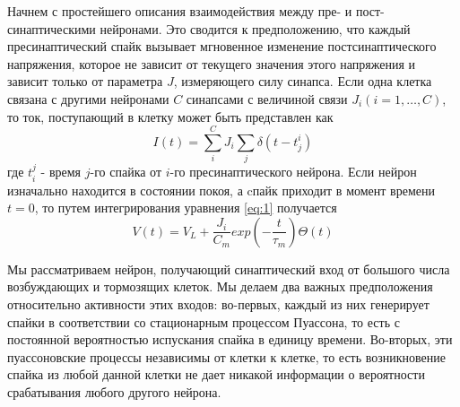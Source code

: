 Начнем с простейшего описания взаимодействия между пре- и пост-синаптическими нейронами. Это сводится к предположению, что каждый пресинаптический спайк вызывает мгновенное изменение постсинаптического напряжения, которое не зависит от текущего значения этого напряжения и зависит только от параметра $J$, измеряющего силу синапса. Если одна клетка связана с другими нейронами $C$ синапсами с величиной связи $J_i (i=1,\ldots,C)$, то ток, поступающий в клетку может быть представлен как
\begin{equation}
	I(t)=\sum_{i}^{C}J_i\sum_{j}\delta(t-t_j^i)
	\label{eq:3}
\end{equation}
где $t_i^j$ - время $j$-го спайка от $i$-го пресинаптического нейрона. Если нейрон изначально находится в состоянии покоя, а cпайк приходит в момент времени $t=0$, то путем интегрирования уравнения \eqref{eq:1} получается
\begin{equation}
	V(t)=V_L+\frac{J_i}{C_m}exp(-\frac{t}{\tau_m})\Theta(t)
	\label{eq:4}
\end{equation}

Мы рассматриваем нейрон, получающий синаптический вход от большого числа возбуждающих и тормозящих клеток. Мы делаем два важных предположения относительно активности этих входов: во-первых, каждый из них генерирует спайки в соответствии со стационарным процессом Пуассона, то есть с постоянной вероятностью испускания спайка в единицу времени. Во-вторых,
эти пуассоновские процессы независимы от клетки к клетке, то есть возникновение спайка из любой данной клетки не дает никакой информации о вероятности срабатывания любого другого нейрона.

